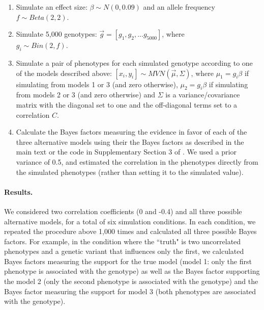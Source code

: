 \documentclass[11pt,titlepage]{article}
\begin{document}
\begin{enumerate}
\item Simulate an effect size: $\beta \sim N(0, 0.09)$ and an allele frequency $f \sim Beta(2,2)$.
\item Simulate 5,000 genotypes: $\vec g = [g_1, g_2, ... g_{5000}]$, where \\ $g_i \sim Bin(2, f)$.
\item Simulate a pair of phenotypes for each simulated genotype according to one of the models described above: $[x_i, y_i] \sim MVN(\vec \mu, \Sigma)$, where $\mu_1 = g_i \beta$ if simulating from models 1 or 3 (and zero otherwise), $\mu_2 = g_i \beta$ if simulating from models 2 or 3 (and zero otherwise) and $\Sigma$ is a variance/covariance matrix with the diagonal set to one and the off-diagonal terms set to a correlation $C$.
\item Calculate the Bayes factors measuring the evidence in favor of each of the three alternative models using their the Bayes factors as described in the main text or the code in Supplementary Section 3 of \citet{Stephens:2013fk}. We used a prior variance of 0.5, and estimated the correlation in the phenotypes directly from the simulated phenotypes (rather than setting it to the simulated value).
\end{enumerate}

\paragraph{Results.} We considered two correlation coefficients (0 and -0.4) and all three possible alternative models, for a total of six simulation conditions. In each condition, we repeated the procedure above 1,000 times and calculated all three possible Bayes factors. For example, in the condition where the ``truth" is two uncorrelated phenotypes and a genetic variant that influences only the first, we calculated Bayes factors measuring the support for the true model (model 1: only the first phenotype is associated with the genotype) as well as the Bayes factor supporting the model 2 (only the second phenotype is associated with the genotype) and the Bayes factor measuring the support for model 3 (both phenotypes are associated with the genotype). 
\end{document}
